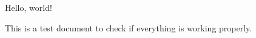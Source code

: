 \documentclass{article}
\begin{document}
Hello, world!

This is a test document to check if everything is working properly.
\end{document}
